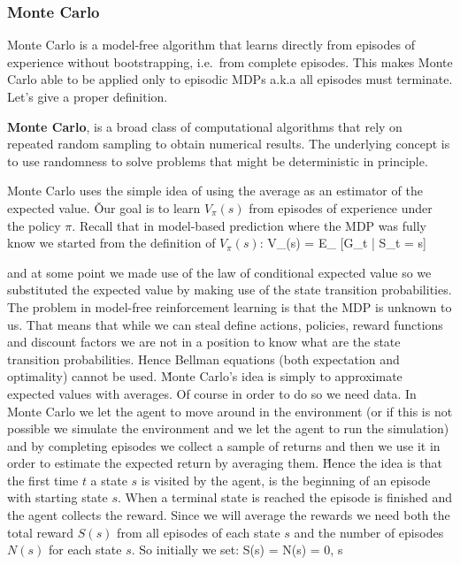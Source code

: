 \subsubsection{Monte Carlo}

Monte Carlo is a model-free algorithm that learns directly from episodes of experience without bootstrapping, i.e.\
from complete episodes. This makes Monte Carlo able to be applied only to episodic MDPs a.k.a all episodes must
terminate. Let's give a proper definition.

\textbf{Monte Carlo}, is a broad class of computational algorithms that rely on repeated random sampling to obtain
numerical results. The underlying concept is to use randomness to solve problems that might be deterministic in
principle.
\ed

Monte Carlo uses the simple idea of using the average as an estimator of the expected value. \v

Our goal is to learn $V_\pi(s)$ from episodes of experience under the policy $\pi$. Recall that in model-based
prediction where the MDP was fully know we started from the definition of $V_\pi(s)$:
\bse
V_{\pi}(s) = E_{\pi} [G_t | S_t = s]
\ese

and at some point we made use of the law of conditional expected value so we substituted the expected value by making
use of the state transition probabilities. The problem in model-free reinforcement learning is that the MDP is
unknown to us. That means that while we can steal define actions, policies, reward functions and discount factors we
are not in a position to know what are the state transition probabilities. Hence Bellman equations (both expectation
and optimality) cannot be used. \v

Monte Carlo's idea is simply to approximate expected values with averages. Of course in order to do so we need data.
In Monte Carlo we let the agent to move around in the environment (or if this is not possible we simulate the
environment and we let the agent to run the simulation) and by completing episodes we collect a sample of returns and
then we use it in order to estimate the expected return by averaging them. \v

Hence the idea is that the first time $t$ a state $s$ is visited by the agent, is the beginning of an episode with
starting state $s$. When a terminal state is reached the episode is finished and the agent collects the reward. Since
we will average the rewards we need both the total reward $S(s)$ from all episodes of each state $s$ and the number
of episodes $N(s)$ for each state $s$. So initially we set:
\bse
S(s) = N(s) = 0, \:\: \forall s
\ese


